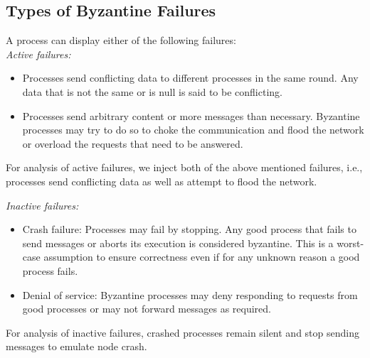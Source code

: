 \subsection{Types of Byzantine Failures} \label{sec:behavior} A process can
display either of the following failures: \\
\textit{Active failures:}
\begin{itemize} 
        \item Processes send conflicting data to different processes in
            the same round. Any data that is not the same or is null is said to
            be conflicting. 
        \item Processes send arbitrary content or more
                messages than necessary. Byzantine processes may try to do so
                to choke the communication and flood the network or overload
                the requests that need to be answered. 
\end{itemize}
For analysis of active failures, we inject both of the above mentioned
failures, i.e., processes send conflicting data as well as attempt to flood the
network.

\noindent \textit{Inactive failures:} 
\begin{itemize} 
    \item Crash failure:
                        Processes may fail by stopping. Any good process that
                        fails to send messages or aborts its execution is
                        considered byzantine. This is a worst-case assumption
                        to ensure correctness even if for any unknown reason
                        a good process fails.  
    \item Denial of service:
                            Byzantine processes may deny responding to requests
                            from good processes or may not forward messages as
                            required.  
\end{itemize}
For analysis of inactive failures, crashed processes remain silent and stop
sending messages to emulate node crash.

